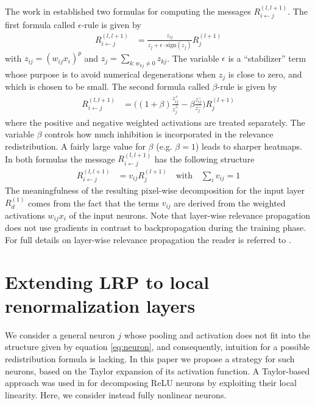 \documentclass[runningheads,a4paper]{llncs}
\newcommand{\eps}{\epsilon}
\begin{document}
The work in \cite{BacBinMonKlaMueSam15} established two formulas for computing the messages $R^{(l,l+1)}_{i \leftarrow j}$. The first formula called $\epsilon$-rule is given by
\begin{align}
R^{(l,l+1)}_{i \leftarrow j} & = \frac{ z_{ij} }{ z_j + \epsilon \cdot \mathrm{sign}(z_j) }R^{(l+1)}_j \label{eq:message1}
\end{align}
with $z_{ij} = (w_{ij} x_i )^p$ and $z_j = \sum_{k: w_{kj} \neq 0 } z_{kj}$.
The variable $\eps$ is a ``stabilizer'' term whose purpose is to avoid numerical degenerations when $z_j$ is close to zero, and which is chosen to be small. The second formula called $\beta$-rule is given by
\begin{align}
R^{(l,l+1)}_{i \leftarrow j} & = \Big((1+\beta)\frac{ z_{ij}^{+} }{ z_j^{+} }-\beta \frac{ z_{ij}^{-} }{ z_j^{-} } \Big)  R^{(l+1)}_j \label{eq:message2}
\end{align}
where the positive and negative weighted activations are treated separately. The variable $\beta$ controls how much inhibition is incorporated in the relevance redistribution. A fairly large value for $\beta$ (e.g. $\beta = 1$) leads to sharper heatmaps. In both formulas the message $R^{(l,l+1)}_{i \leftarrow j}$ has the following structure
\begin{align}
R^{(l,l+1)}_{i \leftarrow j} & = v_{ij} R^{(l+1)}_j \quad \mathrm{with} \quad {\textstyle \sum_i} v_{ij} = 1 
\end{align}
The meaningfulness of the resulting pixel-wise decomposition for the input layer $R_d^{(1)}$ comes from the fact that the terms $v_{ij}$ are derived from the weighted activations $w_{ij}x_i$ of the input neurons. Note that layer-wise relevance propagation does not use gradients in contrast to backpropagation during the training phase. For full details on layer-wise relevance propagation the reader is referred to \cite{BacBinMonKlaMueSam15}. 

\section{Extending LRP to local renormalization layers}
\label{sec:localrenormalization}

We consider a general neuron $j$ whose pooling and activation does not fit into the structure given by equation \ref{eq:neuron}, and consequently, intuition for a possible redistribution formula is lacking. In this paper we propose a strategy for such neurons, based on the Taylor expansion of its activation function. A Taylor-based approach was used in \cite{montavon2015explaining} for decomposing ReLU neurons by exploiting their local linearity. Here, we consider instead fully nonlinear neurons.
\end{document}
